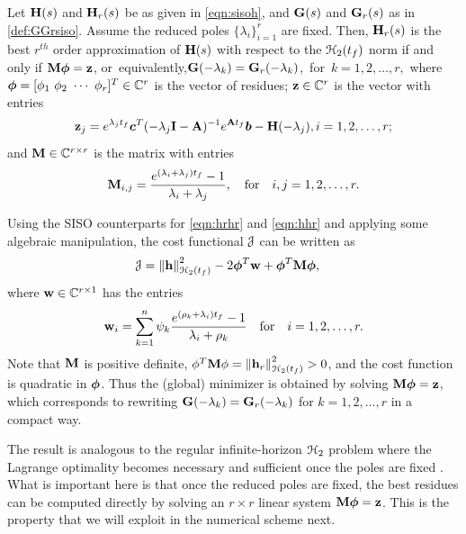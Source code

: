 \documentclass[twocolumn]{autart}
\begin{document}
\begin{corollary}\label{optres}
Let $\mathbf{H}(s)$ and $\mathbf{H}_r(s)$ be as given in \eqref{eqn:sisoh}, and $\mathbf{G}(s)$ and $\mathbf{G}_r(s)$ as
in \eqref{def:GGrsiso}.  Assume  the reduced  poles   $\{\lambda_i\}_{i=1}^r$ are fixed. Then,
$\mathbf{H}_r(s)$ is the best $r^{th}$ order approximation of $\mathbf{H}(s)$ with respect to the $\EuScript{H}_2({t_f})$ norm if and only if  $\mathbf{M} {\boldsymbol{\phi}}= \mathbf{z}$, \mbox{or~equivalently},$\mathbf{G}(-\lambda_k)=\mathbf{G}_r(-\lambda_k)$,\ \mbox{for}\ $k = 1,2,\ldots, r,$
where  ${\boldsymbol{\phi}} = [\phi_1~\phi_2~\cdots~\phi_r]^T \in \mathbb{C}^r$ is the vector of  residues; 
$\mathbf{z} \in \mathbb{C}^r$ is the vector with  entries 
$$
\mathbf{z}_j=e^{\lambda_j{t_f}}{\boldsymbol{c}}^T(-\lambda_j\mathbf{I}-\mathbf{A})^{-1}e^{\mathbf{A} {t_f}}{\boldsymbol{b}}-\mathbf{H}(-\lambda_j), 
i=1,2,\ldots,r ;
$$
and 
$\mathbf{M} \in \mathbb{C}^{r\times r}$  is the  matrix with  entries
$$
\mathbf{M}_{i,j}=\dfrac{e^{(\lambda_i+\lambda_j){t_f}}-1}{\lambda_i+\lambda_j}, \quad \mbox{for}\quad
i,j=1,2,\ldots,r.$$
\end{corollary}
\begin{pf}
Using the SISO counterparts for \eqref{eqn:hrhr} and \eqref{eqn:hhr} and applying some algebraic manipulation, the cost functional $\EuScript{J}$ can be written as
\begin{align*}
\EuScript{J}&= \left\lVert\mathbf{h}\right\rVert_{\EuScript{H}_2(t_f)}^2  - 2{\boldsymbol{\phi}}^{T}\mathbf{w} + {\boldsymbol{\phi}}^{T}\mathbf{M}{\boldsymbol{\phi}},
\end{align*}
where $\mathbf{w} \in \mathbb{C}^{r\times 1}$ has the entries
 $$\mathbf{w}_i=\sum_{k=1}^n \psi_k \dfrac{e^{(\rho_k+\lambda_i){t_f}}-1}{\lambda_i+\rho_k}  \quad \mbox{for}\quad i=1,2,\ldots,r.$$
Note that 
$\mathbf{M}$ is positive definite, $\phi^{T}\mathbf{M}\phi=\left\lVert\mathbf{h}_r\right\rVert_{\EuScript{H}_2({t_f})}^2 > 0$, and the cost function is quadratic in ${\boldsymbol{\phi}}$. Thus the (global) minimizer is  obtained by solving $\mathbf{M} {\boldsymbol{\phi}}= \mathbf{z}$, which corresponds to rewriting  $\mathbf{G}(-\lambda_k)=\mathbf{G}_r(-\lambda_k)$ for $k = 1,2,\ldots, r$ in a compact way. 
\end{pf}
The result is analogous to the regular infinite-horizon $\EuScript{H}_2$ problem where the Lagrange optimality becomes necessary and sufficient once the poles are fixed \cite{gaier1987lectures,beattie2012realization}. What is important here is that once the reduced poles are fixed, the best residues can be computed directly by solving an $r\times r$ linear system $\mathbf{M} {\boldsymbol{\phi}}= \mathbf{z}$.  This is the property that we will exploit in the numerical scheme next.
\end{document}
